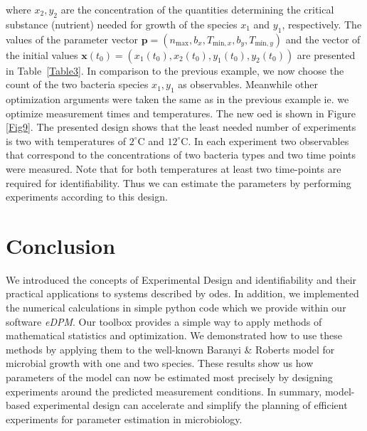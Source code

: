 \documentclass[graybox]{svmult}
\newcommand{\mbx}{\mathbf{x}}
\newcommand{\mbp}{\mathbf{p}}
\begin{document}
where $x_2, y_2$ are the concentration of the quantities determining the critical substance (nutrient) needed for growth of the species $x_1$ and $y_1$, respectively.
The values of the parameter vector $\mbp = (n_\text{max}, b_x, T_{\text{min}, x}, b_y, T_{\text{min}, y})$ and the vector of the initial values $\mbx(t_0)=(x_1(t_0), x_2(t_0), y_1(t_0), y_2(t_0))$ are presented in Table~\ref{Table3}.
%
In comparison to the previous example, we now choose the count of the two bacteria species $x_1,y_1$ as observables.
Meanwhile other optimization arguments were taken the same as in the previous example ie. we optimize measurement times and temperatures.
The new \ac{oed} is shown in Figure \ref{Fig9}.
%
%
The presented design shows that the least needed number of experiments is two with temperatures of $2^\circ$C and $12^\circ$C.
In each experiment two observables that correspond to the concentrations of two bacteria types and two time points were measured.
Note that for both temperatures at least two time-points are required for identifiability.
Thus we can estimate the parameters by performing experiments according to this design.
%
%
%
\section*{Conclusion}
We introduced the concepts of Experimental Design and identifiability and their practical applications to systems described by \acp{ode}.
In addition, we implemented the numerical calculations in simple python code which we provide within our software {\it eDPM}.
Our toolbox provides a simple way to apply methods of mathematical statistics and optimization.
We demonstrated how to use these methods by applying them to the well-known Baranyi \& Roberts model for microbial growth with one and two species.
These results show us how parameters of the model can now be estimated most precisely by designing experiments around the predicted measurement conditions.
In summary, model-based experimental design can accelerate and simplify the planning of efficient experiments for parameter estimation in microbiology.
%
%
%
\end{document}
